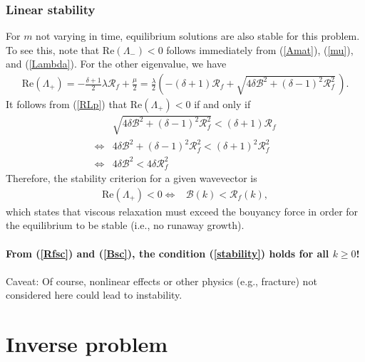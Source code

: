 \documentclass[paper=a4, fontsize=11pt]{article}
\begin{document}
\subsubsection*{Linear stability}
For $m$ not varying in time, equilibrium solutions are also stable for this problem.
To see this, note that $\mathrm{Re}(\Lambda_-)<0$ follows immediately
from (\ref{Amat}), (\ref{mu}), and (\ref{Lambda}).
For the other eigenvalue, we have
\begin{align}
\mathrm{Re}(\Lambda_+) = -\frac{\delta+1}{2}\lambda\mathcal{R}_f + \frac{\mu}{2}
= \frac{\lambda}{2}\left(-(\delta+1)\mathcal{R}_f+\sqrt{4\delta\mathcal{B}^2 + (\delta-1)^2\mathcal{R}_f^2 } \,\right). \label{RLp}
\end{align}
It follows from (\ref{RLp}) that $\mathrm{Re}(\Lambda_+)<0$ if and only if
\begin{align}
&\sqrt{4\delta\mathcal{B}^2 + (\delta-1)^2\mathcal{R}_f^2 } < (\delta+1)\mathcal{R}_f \\
\iff &4\delta\mathcal{B}^2 + (\delta-1)^2\mathcal{R}_f^2 < (\delta+1)^2 \mathcal{R}_f^2 \\
\iff &4\delta\mathcal{B}^2 < 4\delta \mathcal{R}_f^2
\end{align}
Therefore, the stability criterion for a given wavevector is
\begin{align}
\mathrm{Re}(\Lambda_+)<0  \iff &\mathcal{B}(k) < \mathcal{R}_f(k), \label{stability}
\end{align}
which states that viscous relaxation must exceed the bouyancy force
in order for the equilibrium to be stable (i.e., no runaway growth). \\ \\
\textbf{From (\ref{Rfsc}) and (\ref{Bsc}),
the condition (\ref{stability}) holds for all $k\geq 0$!}
\\ \\
Caveat: Of course, nonlinear
effects or other physics (e.g., fracture) not considered here could lead to instability.

\section*{Inverse problem}
\end{document}
